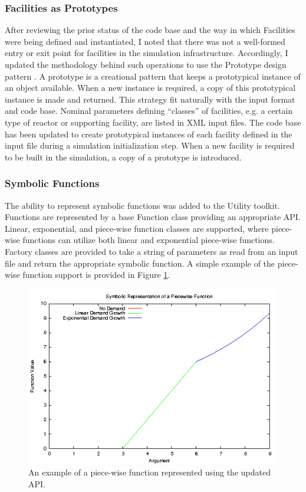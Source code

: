 \subsubsection{Facilities as Prototypes}
After reviewing the prior status of the code base and the way in which
Facilities were being defined and instantiated, I noted that there was not a
well-formed entry or exit point for facilities in the simulation
infrastructure. Accordingly, I updated the methodology behind such operations to
use the Prototype design pattern \cite{vlissides_design_1995}. A prototype is a
creational pattern that keeps a prototypical instance of an object
available. When a new instance is required, a copy of this prototypical instance
is made and returned. This strategy fit naturally with the \Cyclus input format
and code base. Nominal parameters defining ``classes'' of facilities, e.g. a
certain type of reactor or supporting facility, are listed in XML input
files. The code base has been updated to create prototypical instances of each
facility defined in the input file during a simulation initialization step. When
a new facility is required to be built in the simulation, a copy of a prototype
is introduced.

\subsubsection{Symbolic Functions}

The ability to represent symbolic functions was added to the \Cyclus Utility
toolkit. Functions are represented by a base Function class providing an
appropriate API. Linear, exponential, and piece-wise function classes are
supported, where piece-wise functions can utilize both linear and exponential
piece-wise functions. Factory classes are provided to take a string of parameters
as read from an input file and return the appropriate symbolic function. A
simple example of the piece-wise function support is provided in Figure
\ref{fig:piecewise}.

\begin{figure}[H]
  \begin{center}
    \includegraphics[width=\linewidth]{./chapters/prevwork/piecewise.png}
  \caption{An example of a piece-wise function represented using the updated API.}
  \label{fig:piecewise}
  \end{center}
\end{figure}

